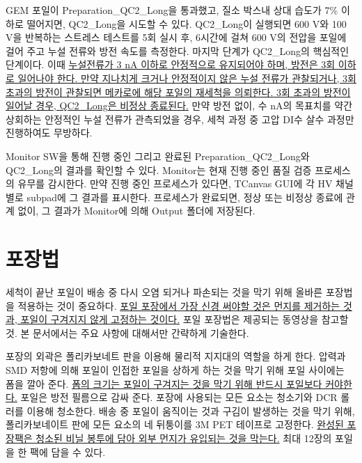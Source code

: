 \documentclass[11pt]{article}
\begin{document}
GEM 포일이 Preparation\_QC2\_Long을 통과했고, 질소 박스내 상대 습도가 7\% 이하로 떨어지면, QC2\_Long을 시도할 수 있다. QC2\_Long이 실행되면 600 V와 100 V을 반복하는 스트레스 테스트를 5회 실시 후, 6시간에 걸쳐 600 V의 전압을 포일에 걸어 주고 누설 전류와 방전 속도를 측정한다. 마지막 단계가 QC2\_Long의 핵심적인 단계이다. 이때 \uline{누설전류가 3 nA 이하로 안정적으로 유지되어야 하며, 방전은 3회 이하로 일어나야 한다. 만약 지나치게 크거나 안정적이지 않은 누설 전류가 관찰되거나, 3회 초과의 방전이 관찰되면 메카로에 해당 포일의 재세척을 의뢰한다. 3회 초과의 방전이 일어날 경우, QC2\_Long은 비정상 종료된다.} 만약 방전 없이, 수 nA의 목표치를 약간 상회하는 안정적인 누설 전류가 관측되었을 경우, 세척 과정 중 고압 DI수 살수 과정만 진행하여도 무방하다.

Monitor SW을 통해 진행 중인 그리고 완료된 Preparation\_QC2\_Long와 QC2\_Long의 결과를 확인할 수 있다. Monitor는 현재 진행 중인 품질 검증 프로세스의 유무를 감시한다. 만약 진행 중인 프로세스가 있다면, TCanvas GUI에 각 HV 채널 별로 subpad에 그 결과를 표시한다. 프로세스가 완료되면, 정상 또는 비정상 종료에 관계 없이, 그 결과가 Monitor에 의해 Output 폴더에 저장된다.   

  
\section{포장법}
세척이 끝난 포일이 배송 중 다시 오염 되거나 파손되는 것을 막기 위해 올바른 포장법을 적용하는 것이 중요하다. \uline{포일 포장에서 가장 신경 써야할 것은 먼지를 제거하는 것과, 포일이 구겨지지 않게 고정하는 것이다.} 포일 포장법은 제공되는 동영상을 참고할 것. 본 문서에서는 주요 사항에 대해서만 간략하게 기술한다.

포장의 외곽은 폴리카보네트 판을 이용해 물리적 지지대의 역할을 하게 한다. 압력과 SMD 저항에 의해 포일이 인접한 포일을 상하게 하는 것을 막기 위해 포일 사이에는 폼을 깔아 준다. \uline{폼의 크기는 포일이 구겨지는 것을 막기 위해 반드시 포일보다 커야한다.} 포일은 방전 필름으로 감싸 준다. 포장에 사용되는 모든 요소는 청소기와 DCR 롤러를 이용해 청소한다. 배송 중 포일이 움직이는 것과 구김이 발생하는 것을 막기 위해, 폴리카보네이트 판에 모든 요소의 네 뒤퉁이를 3M PET 테이프로 고정한다. \uline{완성된 포장팩은 청소된 비닐 봉투에 담아 외부 먼지가 유입되는 것을 막는다.} 최대 12장의 포일을 한 팩에 담을 수 있다.     
\end{document}

